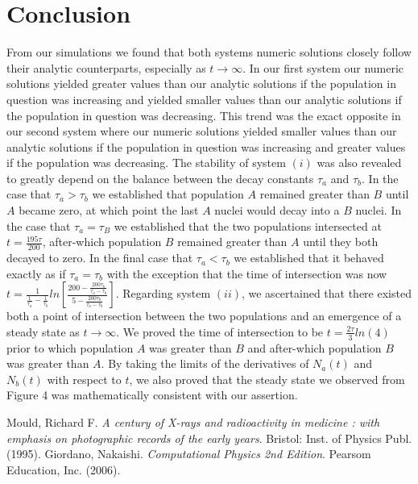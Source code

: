 \documentclass[twocolumn]{article}
\begin{document}
\section{Conclusion}
\hspace{\parindent} From our simulations we found that both systems numeric solutions closely follow their analytic counterparts, especially as $t\to\infty$. In our first system our numeric solutions yielded greater values than our analytic solutions if the population in question was increasing and yielded smaller values than our analytic solutions if the population in question was decreasing. This trend was the exact opposite in our second system where our numeric solutions yielded smaller values than our analytic solutions if the population in question was increasing and greater values if the population was decreasing. The stability of system $(i)$ was also revealed to greatly depend on the balance between the decay constants $\tau_a$ and $\tau_b$. In the case that $\tau_a>\tau_b$ we established that  population $A$ remained greater than $B$ until $A$ became zero, at which point the last $A$ nuclei would decay into a $B$ nuclei. In the case that $\tau_a=\tau_B$ we established that the two populations intersected at $t=\frac{195\tau}{200}$, after-which population $B$ remained greater than $A$ until they both decayed to zero. In the final case that $\tau_a<\tau_b$ we established that it behaved exactly as if $\tau_a=\tau_b$ with the exception that the time of intersection was now $t=\frac{1}{\frac{1}{\tau_a}-\frac{1}{\tau_b}}ln\left[\frac{200-\frac{200\tau_b}{\tau_a-\tau_b}}{5-\frac{200\tau_b}{\tau_a-\tau_b}}\right]$. Regarding system $(ii)$, we ascertained that there existed both a point of intersection between the two populations and an emergence of a steady state as $t\to\infty$. We proved the time of intersection to be $t=\frac{2\tau}{3}ln\left(4\right)$ prior to which population $A$ was greater than $B$ and after-which population $B$ was greater than $A$. By taking the limits of the derivatives of $N_a(t)$ and $N_b(t)$ with respect to $t$, we also proved that the steady state we observed from Figure 4 was mathematically consistent with our assertion. 
%
\begin{thebibliography}{9}
Mould, Richard F.
\textit{A century of X-rays and radioactivity in medicine : with emphasis on photographic records of the early years}. 
Bristol: Inst. of Physics Publ. (1995).
Giordano, Nakaishi.
\textit{Computational Physics 2nd Edition}. 
Pearsom Education, Inc. (2006).
\end{thebibliography}
\end{document}
